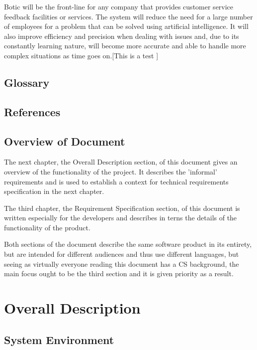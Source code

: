 \documentclass[11pt]{article}
\begin{document}
Botic will be the front-line for any company that provides customer service feedback facilities or services. The system will reduce the need for a large number of employees for a problem that can be solved using artificial intelligence. It will also improve efficiency and precision when dealing with issues and, due to its constantly learning nature, will become more accurate and able to handle more complex situations as time goes on.[This is a test \cite{Book:1}]

\subsection{Glossary}
\subsection{References}



\subsection{Overview of Document}
The next chapter, the Overall Description section, of this document gives an overview of the functionality of the project. It describes the 'informal' requirements and is used to establish a context for technical requirements specification in the next chapter.\par
The third chapter, the Requirement Specification section, of this document is written especially for the developers and describes in terns the details of the functionality of the product.\par
Both sections of the document describe the same software product in its entirety, but are intended for different audiences and thus use different languages, but seeing as virtually everyone reading this document has a CS background, the main focus ought to be the third section and it is given priority as a result.

\section{Overall Description}
\subsection{System Environment}
\end{document}
